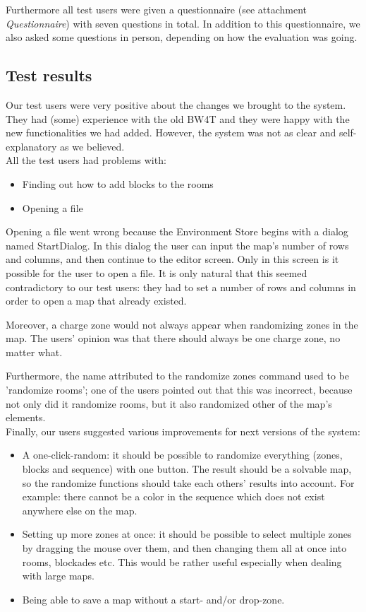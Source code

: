Furthermore all test users were given a questionnaire (see attachment \textit{Questionnaire}) with seven questions in total. In addition to this questionnaire, we also asked some questions in person, depending on how the evaluation was going.

\subsection*{Test results}
Our test users were very positive about the changes we brought to the system. They had (some) experience with the old BW4T and they were happy with the new functionalities we had added. However, the system was not as clear and self-explanatory as we believed. \\

All the test users had problems with:
\begin{itemize}
\item Finding out how to add blocks to the rooms
\item Opening a file
\end{itemize}

Opening a file went wrong because the Environment Store begins with a dialog named StartDialog. In this dialog the user can input the map's number of rows and columns, and then continue to the editor screen. Only in this screen is it possible for the user to open a file. It is only natural that this seemed contradictory to our test users: they had to set a number of rows and columns in order to open a map that already existed. 

Moreover, a charge zone would not always appear when randomizing zones in the map. The users' opinion was that there should always be one charge zone, no matter what.

Furthermore, the name attributed to the randomize zones command used to be 'randomize rooms'; one of the users pointed out that this was incorrect, because not only did it randomize rooms, but it also randomized other of the map's elements. \\

Finally, our users suggested various improvements for next versions of the system:

\begin{itemize}
\item A one-click-random: it should be possible to randomize everything (zones, blocks and sequence) with one button. The result should be a solvable map, so the randomize functions should take each others' results into account. For example: there cannot be a color in the sequence which does not exist anywhere else on the map.
\item Setting up more zones at once: it should be possible to select multiple zones by dragging the mouse over them, and then changing them all at once into rooms, blockades etc. This would be rather useful especially when dealing with large maps. 
\item Being able to save a map without a start- and/or drop-zone. 
\end{itemize}

